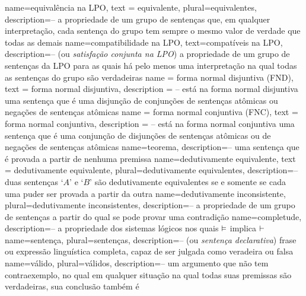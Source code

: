 {
  name=equivalência na LPO,
  text = equivalente,
  plural=equivalentes,
description={-- a propriedade de um grupo de sentenças que, em qualquer interpretação, cada sentença do grupo tem sempre o mesmo valor de verdade que todas as demais}
}
{
  name=compatibilidade na LPO,
  text=compatíveis na LPO,
description={-- (ou \textit{satisfação conjunta na LPO}) a propriedade de um grupo de sentenças da LPO para as quais há pelo menos uma interpretação na qual todas as sentenças do grupo são verdadeiras}
}
{
  name = forma normal disjuntiva (FND),
  text = forma normal disjuntiva,
  description = {-- está na forma normal disjuntiva uma sentença que é uma disjunção de conjunções de sentenças atômicas ou negações de sentenças atômicas}
}
{
  name = forma normal conjuntiva (FNC),
  text = forma normal conjuntiva,
  description = {-- está na forma normal conjuntiva uma sentença que é uma conjunção de disjunções de sentenças atômicas ou de negações de sentenças atômicas}
}
{
 name=teorema,
 description={-- uma sentença que é provada a partir de nenhuma premissa}
}
{
 name=dedutivamente equivalente,
 text = dedutivamente equivalente,
 plural=dedutivamente equivalentes,
 description={-- duas sentenças `$A$' e `$B$' são  dedutivamente equivalentes  se e somente se cada  uma puder ser provada a partir da outra}
}
{
 name={dedutivamente inconsistente}, 
 plural={dedutivamente inconsistentes},
 description={-- a propriedade de um grupo de sentenças a partir do qual se pode provar uma contradição}
}
{
 name=completude,
 description={-- a propriedade dos sistemas lógicos nos quais $\vDash $ implica $\vdash$}
}
{
 name=sentença,
 plural=sentenças,
 description={-- (ou \textit{sentença declarativa}) frase ou expressão linguística completa, capaz de ser julgada como veradeira ou falsa}
}
{
 name=válido,
 plural=válidos,
 description={-- um argumento que não tem contraexemplo, no qual em qualquer situação na qual todas suas premissas são verdadeiras, sua conclusão também é}
}
